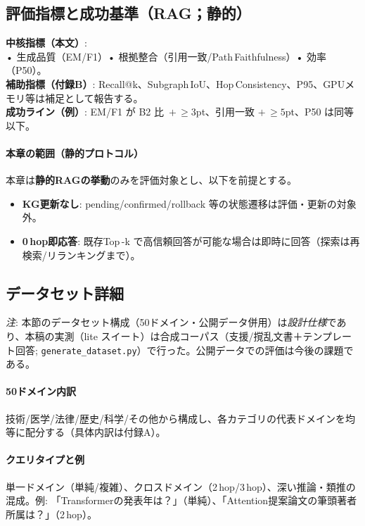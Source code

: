 \documentclass[ja=standard,xelatex]{bxjsarticle}
\begin{document}
\subsection{評価指標と成功基準（RAG；静的）}
\label{sec:rag_metrics_success}
\textbf{中核指標（本文）}: \\
\hspace*{1.2em}• 生成品質（EM/F1）\;\;• 根拠整合（引用一致/Path\,Faithfulness）\;\;• 効率（P50）。\\
\textbf{補助指標（付録B）}: Recall@k、Subgraph\,IoU、Hop\,Consistency、P95、GPUメモリ等は補足として報告する。\\
\textbf{成功ライン（例）}: EM/F1 が B2 比 \,$+\,\ge3$pt、引用一致 $+\,\ge5$pt、P50 は同等以下。\\

\paragraph{本章の範囲（静的プロトコル）} 本章は\textbf{静的RAGの挙動}のみを評価対象とし、以下を前提とする。
\begin{itemize}[leftmargin=1.6em]
  \item \textbf{KG更新なし}: pending/confirmed/rollback 等の状態遷移は評価・更新の対象外。
  \item \textbf{0\,hop即応答}: 既存Top\,\mbox{-}k で高信頼回答が可能な場合は即時に回答（探索は再検索/リランキングまで）。
\end{itemize}

\subsection{データセット詳細}\label{sec:rag_dataset}
\noindent\textit{注}: 本節のデータセット構成（50ドメイン・公開データ併用）は\emph{設計仕様}であり、本稿の実測（lite スイート）は合成コーパス（支援/撹乱文書＋テンプレート回答; \texttt{generate\_dataset.py}）で行った。公開データでの評価は今後の課題である。\\
\paragraph{50ドメイン内訳}\; 技術/医学/法律/歴史/科学/その他から構成し、各カテゴリの代表ドメインを均等に配分する（具体内訳は付録A）。\\
\paragraph{クエリタイプと例}\; 単一ドメイン（単純/複雑）、クロスドメイン（2\,hop/3\,hop）、深い推論・類推の混成。例: 「Transformerの発表年は？」（単純）、「Attention提案論文の筆頭著者所属は？」（2\,hop）。\\
\end{document}
